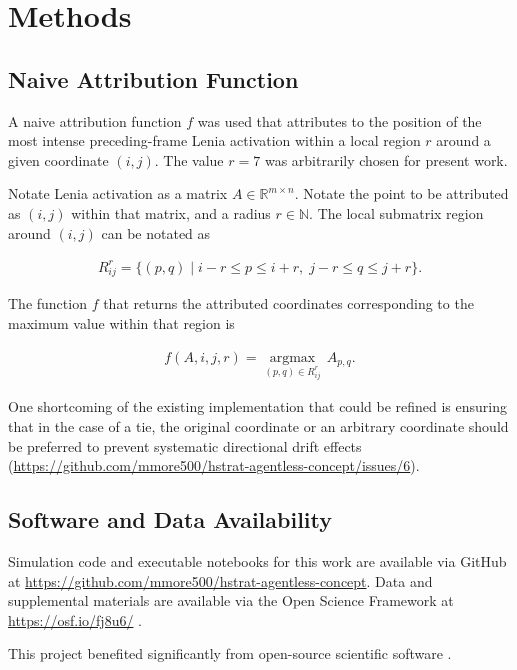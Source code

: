 \section{Methods} \label{sec:methods}

\subsection{Naive Attribution Function}
\label{sec:attribution}

A naive attribution function $f$ was used that attributes to the position of the most intense preceding-frame Lenia activation within a local region $r$ around a given coordinate $(i, j)$.
The value $r=7$ was arbitrarily chosen for present work.

Notate Lenia activation as a matrix $A \in \mathbb{R}^{m \times n}$.
Notate the point to be attributed as $(i,j)$ within that matrix, and a radius $r \in \mathbb{N}$.
The local submatrix region around $(i,j)$ can be notated as

\begin{align*}
R_{ij}^r = \{ (p,q) \mid i - r \le p \le i + r,\; j - r \le q \le j + r \}.
\end{align*}

The function $f$ that returns the attributed coordinates corresponding to the maximum value within that region is

\begin{align*}
f(A, i, j, r) = \underset{(p,q) \in R_{ij}^r}{\operatorname*{argmax}}\, A_{p,q}.
\end{align*}

One shortcoming of the existing implementation that could be refined is ensuring that in the case of a tie, the original coordinate or an arbitrary coordinate should be preferred to prevent systematic directional drift effects (\url{https://github.com/mmore500/hstrat-agentless-concept/issues/6}).

\subsection{Software and Data Availability} \label{sec:materials}

Simulation code and executable notebooks for this work are available via GitHub at \url{https://github.com/mmore500/hstrat-agentless-concept}.
Data and supplemental materials are available via the Open Science Framework at \url{https://osf.io/fj8u6/} \citep{foster2017open}.

This project benefited significantly from open-source scientific software \citep{2020SciPy-NMeth,harris2020array,reback2020pandas,mckinney-proc-scipy-2010,waskom2021seaborn,hunter2007matplotlib,moreno2023teeplot,paszke2019pytorch,moreno2022hstrat}.
